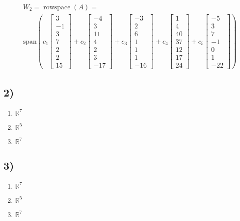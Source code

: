 \documentclass{article}
\DeclareMathOperator{\rowspace}{rowspace}
\begin{document}
\begin{align*}
	& W_2 = \rowspace(A) = \\
	& \text{span} \left(
		c_1 \begin{bmatrix} 3 \\ -1 \\ 3 \\ 7 \\ 2 \\ 2 \\ 15 \end{bmatrix}
		+ c_2 \begin{bmatrix} -4 \\ 3 \\ 11 \\ 4 \\ 2 \\ 3 \\ -17 \end{bmatrix}
		+ c_3 \begin{bmatrix} -3 \\ 2 \\ 6 \\ 1 \\ 1 \\ 1 \\ -16 \end{bmatrix}
		+ c_4 \begin{bmatrix} 1 \\ 4 \\ 40 \\ 37 \\ 12 \\ 17 \\ 24 \end{bmatrix}
		+ c_5 \begin{bmatrix} -5 \\ 3 \\ 7 \\ -1 \\ 0 \\ 1 \\ -22 \end{bmatrix}
	\right)
\end{align*}

\subsection{2)}

\begin{enumerate}[label = \textbf{ $ W_\arabic* $ ambient space: }]
	\item $ \mathbb{R}^7 $
	\item $ \mathbb{R}^5 $
	\item $ \mathbb{R}^7 $
\end{enumerate}

\subsection{3)}

\begin{enumerate}[label = \textbf{ $ W_\arabic*^\perp $ ambient space: }]
	\item $ \mathbb{R}^7 $
	\item $ \mathbb{R}^5 $
	\item $ \mathbb{R}^7 $
\end{enumerate}
\end{document}
